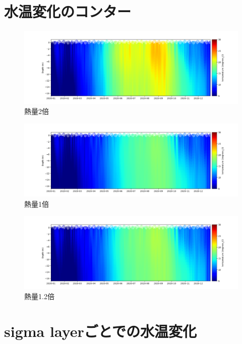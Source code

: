 \documentclass[12pt,a4paper]{jarticle}
\begin{document}
\section{水温変化のコンター}
\begin{figure}[hbtp]
    \includegraphics[keepaspectratio,width=180mm]{contour/Tokyo3_chiba1buoy.png}
    \caption{熱量2倍}
\end{figure}

\begin{figure}[hbtp]
    \centering
        \includegraphics[keepaspectratio,scale=0.5]{contour/Tokyo4_chiba1buoy.png}
    \caption{熱量1倍}
\end{figure}

\begin{figure}[hbtp]
    \centering
        \includegraphics[keepaspectratio,scale=0.5]{contour/Tokyo5_chiba1buoy.png}
    \caption{熱量1.2倍}
\end{figure}

\newpage
\section{sigma layerごとでの水温変化}        
\end{document}
